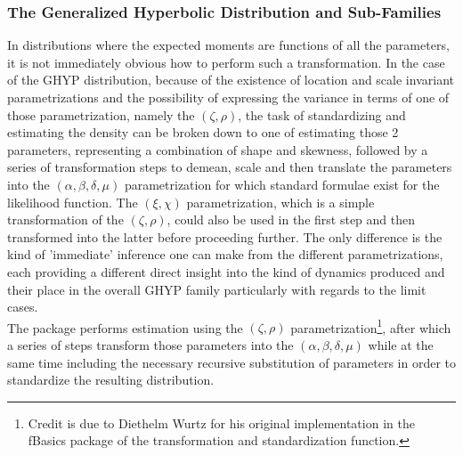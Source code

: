 \subsubsection{The Generalized Hyperbolic Distribution and Sub-Families}\label{ghyp}
In distributions where the expected moments are functions of all the parameters,
it is not immediately obvious how to perform such a transformation. In the case
of the GHYP distribution, because of the existence of location and scale
invariant parametrizations and the possibility of expressing the variance in
terms of one of those parametrization, namely the $(\zeta, \rho)$, the task of
standardizing and estimating the density can be broken down to one of estimating
those 2 parameters, representing a combination of shape and skewness, followed
by a series of transformation steps to demean, scale and then translate the
parameters into the $(\alpha, \beta, \delta, \mu)$ parametrization for which
standard formulae exist for the likelihood function. The $(\xi, \chi)$
parametrization, which is a simple transformation of the $(\zeta, \rho)$,
could also be used in the first step and then transformed into the latter before
proceeding further. The only difference is the kind of 'immediate' inference one
can make from the different parametrizations, each providing a different direct
insight into the kind of dynamics produced and their place in the overall GHYP
family particularly with regards to the limit cases.\\
The \verb@rugarch@ package performs estimation using the $(\zeta, \rho)$
parametrization\footnote{Credit is due to Diethelm Wurtz for his original
implementation in the fBasics package of the transformation and standardization
function.}, after which a series of steps transform those parameters into
the $(\alpha, \beta, \delta, \mu)$ while at the same time including the
necessary recursive substitution of parameters in order to standardize the
resulting distribution.
